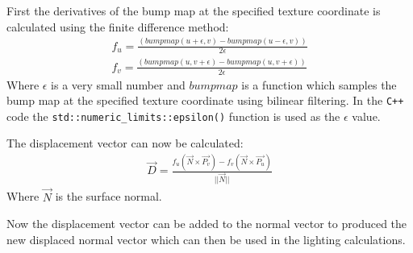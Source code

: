 First the derivatives of the bump map at the specified texture coordinate is
calculated using the finite difference method:
\begin{equation}
\begin{split}
  f_{u} = \frac{(bumpmap(u + \epsilon, v) - bumpmap(u - \epsilon, v))}
  {2\epsilon} \\
  f_{v} = \frac{(bumpmap(u, v + \epsilon) - bumpmap(u, v + \epsilon))}
  {2\epsilon}
\end{split}
\end{equation}
Where $\epsilon$ is a very small number and $bumpmap$ is a function which
samples the bump map at the specified texture coordinate using bilinear
filtering. In the \verb|C++| code the \verb|std::numeric_limits::epsilon()| 
function is used as the $\epsilon$ value.

The displacement vector can now be calculated:
\begin{equation}
\begin{split}
  \vec{D} = \frac{f_{u}(\vec{N}\times\vec{P_{v}}) -
  f_{v}(\vec{N}\times\vec{P_{u}})}{||\vec{N}||}
\end{split}
\end{equation}
Where $\vec{N}$ is the surface normal.

Now the displacement vector can be added to the normal vector to produced the
new displaced normal vector which can then be used in the lighting calculations.

